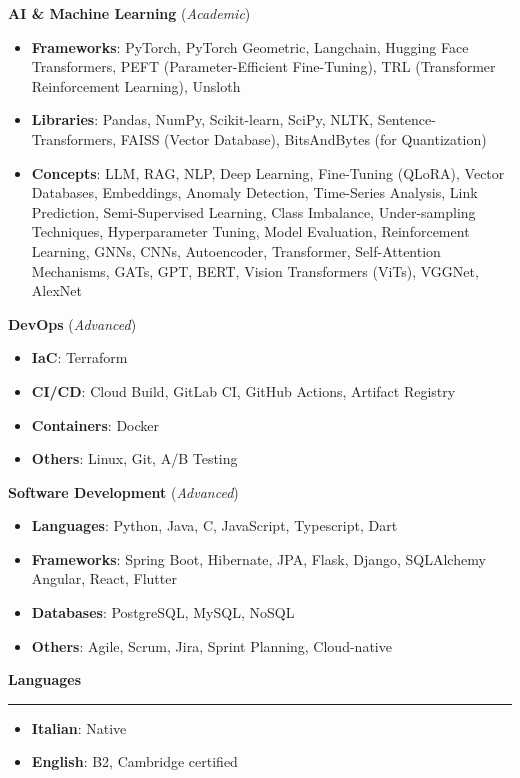 \documentclass[9pt, a4paper]{article}
\newcommand{\cvsection}[1]{%
	\vspace{2pt}\par
	{\Large\bfseries\color{sectionblue}#1}\par
	\vspace{2pt}\hrule\vspace{6pt}
}
\begin{document}
\begin{minipage}[t]{0.32\linewidth}
		{\bfseries AI \& Machine Learning} (\textit{Academic})
		\begin{itemize}[leftmargin=*, nosep, itemsep=2pt]
			\footnotesize
			\item \textbf{Frameworks}: PyTorch, PyTorch Geometric, Langchain, Hugging Face Transformers, PEFT (Parameter-Efficient Fine-Tuning), TRL (Transformer Reinforcement Learning), Unsloth
			
			\item \textbf{Libraries}: Pandas, NumPy, Scikit-learn, SciPy, NLTK, Sentence-Transformers, FAISS (Vector Database), BitsAndBytes (for Quantization) 
			
			\item \textbf{Concepts}: LLM, RAG, NLP, Deep Learning, Fine-Tuning (QLoRA), Vector Databases, Embeddings, Anomaly Detection, Time-Series Analysis, Link Prediction, Semi-Supervised Learning, Class Imbalance, Under-sampling Techniques, Hyperparameter Tuning, Model Evaluation, Reinforcement Learning, GNNs, CNNs, Autoencoder, Transformer, Self-Attention Mechanisms, GATs, GPT, BERT, Vision Transformers (ViTs), VGGNet, AlexNet
		\end{itemize}
		\vspace{4pt}
		
		{\bfseries DevOps} (\textit{Advanced})
		\begin{itemize}[leftmargin=*, nosep, itemsep=2pt]
			\footnotesize
			\item \textbf{IaC}: Terraform
			\item \textbf{CI/CD}: Cloud Build, GitLab CI, GitHub Actions, Artifact Registry
			\item \textbf{Containers}: Docker
			\item \textbf{Others}: Linux, Git, A/B Testing
		\end{itemize}
		\vspace{4pt}
		
		{\bfseries Software Development} (\textit{Advanced})
		\begin{itemize}[leftmargin=*, nosep, itemsep=2pt]
			\footnotesize
			\item \textbf{Languages}: Python, Java, C, JavaScript, Typescript, Dart
			\item \textbf{Frameworks}: Spring Boot, Hibernate, JPA, Flask, Django, SQLAlchemy Angular, React, Flutter
			\item \textbf{Databases}: PostgreSQL, MySQL, NoSQL
			\item \textbf{Others}: Agile, Scrum, Jira, Sprint Planning, Cloud-native
		\end{itemize}
		\vspace{7pt}
		
		\cvsection{Languages}
		\begin{itemize}[leftmargin=*, nosep, itemsep=2pt]
			\item \textbf{Italian}: Native
			\item \textbf{English}: B2, Cambridge certified
		\end{itemize}
		
	\end{minipage}
	
\end{document}
